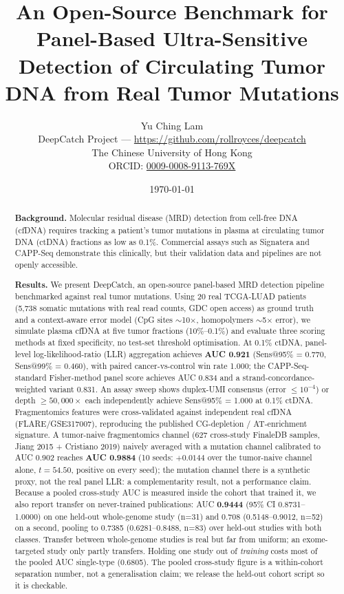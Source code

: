 \documentclass[11pt]{article}
\title{\textbf{An Open-Source Benchmark for Panel-Based Ultra-Sensitive Detection of Circulating Tumor DNA from Real Tumor Mutations}}
\author{Yu Ching Lam\\
  \small DeepCatch Project --- \url{https://github.com/rollroyces/deepcatch}\\
  \small The Chinese University of Hong Kong\\
  \small ORCID: \href{https://orcid.org/0009-0008-9113-769X}{0009-0008-9113-769X}}
\date{\today}
\begin{document}
\maketitle

\begin{abstract}
\textbf{Background.} Molecular residual disease (MRD) detection from cell-free DNA (cfDNA) requires tracking a patient's tumor mutations in plasma at circulating tumor DNA (ctDNA) fractions as low as 0.1\%. Commercial assays such as Signatera and CAPP-Seq demonstrate this clinically, but their validation data and pipelines are not openly accessible.

\textbf{Results.} We present DeepCatch, an open-source panel-based MRD detection pipeline benchmarked against real tumor mutations. Using 20 real TCGA-LUAD patients (5,738 somatic mutations with real read counts, GDC open access) as ground truth and a context-aware error model (CpG sites $\sim$10$\times$, homopolymers $\sim$5$\times$ error), we simulate plasma cfDNA at five tumor fractions (10\%--0.1\%) and evaluate three scoring methods at fixed specificity, no test-set threshold optimisation. At 0.1\% ctDNA, panel-level log-likelihood-ratio (LLR) aggregation achieves \textbf{AUC 0.921} (Sens@95\% = 0.770, Sens@99\% = 0.460), with paired cancer-vs-control win rate 1.000; the CAPP-Seq-standard Fisher-method panel score achieves AUC 0.834 and a strand-concordance-weighted variant 0.831. An assay sweep shows duplex-UMI consensus (error $\le 10^{-4}$) or depth $\ge 50{,}000\times$ each independently achieve Sens@95\% = 1.000 at 0.1\% ctDNA. Fragmentomics features were cross-validated against independent real cfDNA (FLARE/GSE317007), reproducing the published CG-depletion / AT-enrichment signature. A tumor-naive fragmentomics channel (627 cross-study FinaleDB samples, Jiang 2015 + Cristiano 2019) naively averaged with a mutation channel calibrated to AUC 0.902 reaches \textbf{AUC 0.9884} (10 seeds: $+0.0144$ over the tumor-naive channel alone, $t=54.50$, positive on every seed); the mutation channel there is a synthetic proxy, not the real panel LLR: a complementarity result, not a performance claim. Because a pooled cross-study AUC is measured inside the cohort that trained it, we also report transfer on never-trained publications: AUC \textbf{0.9444} (95\% CI 0.8731--1.0000) on one held-out whole-genome study (n=31) and 0.708 (0.5148--0.9012, n=52) on a second, pooling to 0.7385 (0.6281--0.8488, n=83) over held-out studies with both classes. Transfer between whole-genome studies is real but far from uniform; an exome-targeted study only partly transfers. Holding one study out of \emph{training} costs most of the pooled AUC single-type (0.6805). The pooled cross-study figure is a within-cohort separation number, not a generalisation claim; we release the held-out cohort script so it is checkable.


\end{abstract}
\end{document}
